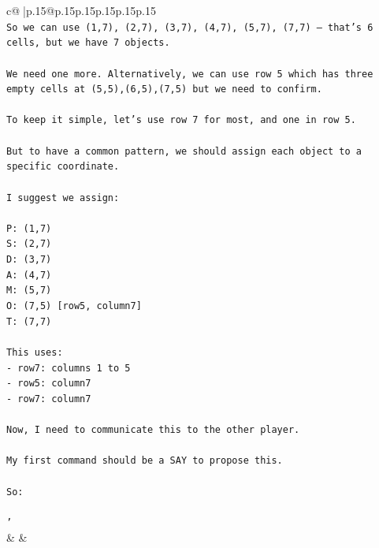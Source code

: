 \documentclass{article}
\begin{document}
{\begin{supertabular}{c@{$\;$}|p{.15\linewidth}@{}p{.15\linewidth}p{.15\linewidth}p{.15\linewidth}p{.15\linewidth}p{.15\linewidth}}
{{{\\ 
\texttt{So we can use (1,7), (2,7), (3,7), (4,7), (5,7), (7,7) — that's 6 cells, but we have 7 objects.} \\
\\ 
\texttt{We need one more. Alternatively, we can use row 5 which has three empty cells at (5,5),(6,5),(7,5) but we need to confirm.} \\
\\ 
\texttt{To keep it simple, let's use row 7 for most, and one in row 5.} \\
\\ 
\texttt{But to have a common pattern, we should assign each object to a specific coordinate.} \\
\\ 
\texttt{I suggest we assign:} \\
\\ 
\texttt{P: (1,7)} \\
\texttt{S: (2,7)} \\
\texttt{D: (3,7)} \\
\texttt{A: (4,7)} \\
\texttt{M: (5,7)} \\
\texttt{O: (7,5)   {[}row5, column7{]}} \\
\texttt{T: (7,7)} \\
\\ 
\texttt{This uses:} \\
\texttt{{-} row7: columns 1 to 5} \\
\texttt{{-} row5: column7} \\
\texttt{{-} row7: column7} \\
\\ 
\texttt{Now, I need to communicate this to the other player.} \\
\\ 
\texttt{My first command should be a SAY to propose this.} \\
\\ 
\texttt{So:} \\
\\ 
\texttt{'} \\
            }
        }
    }
    & & \\ \\


\end{supertabular}}
\end{document}
